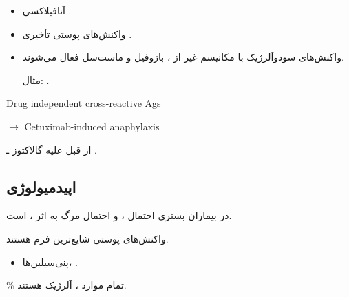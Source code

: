 \documentclass[12pt,a4paper]{article}
\begin{document}
\begin{itemize}
  \item آنافیلاکسی \ADRarrow{} .
  \item واکنش‌های پوستی تأخیری \ADRarrow{} .
  \item واکنش‌های سودوآلرژیک \ADRarrow{} با مکانیسم غیر از ،
  بازوفیل و ماست‌سل فعال می‌شوند.
  \par مثال: .
\end{itemize}

\begin{latin}
\noindent Drug independent cross-reactive Ags
\par\noindent\(\longrightarrow\) Cetuximab-induced anaphylaxis
\end{latin}
از قبل  علیه گالاکتوز ـ .

\subsection*{اپیدمیولوژی}
در بیماران بستری احتمال ،  و احتمال مرگ به اثر
،  است.

واکنش‌های پوستی شایع‌ترین فرم  هستند.
\begin{itemize}
  \item پنی‌سیلین‌ها، .
\end{itemize}
\% تمام موارد ، آلرژیک هستند.
\end{document}
